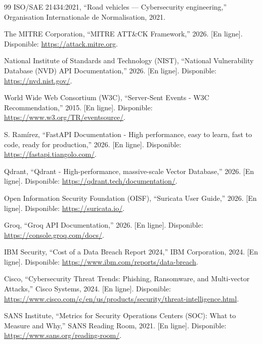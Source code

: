 \documentclass[a4paper, 12pt]{report}
\begin{document}
\begin{thebibliography}{99}
ISO/SAE 21434:2021, ``Road vehicles — Cybersecurity engineering,'' Organisation Internationale de Normalisation, 2021.

The MITRE Corporation, ``MITRE ATT\&CK Framework,'' 2026. [En ligne]. Disponible: \url{https://attack.mitre.org}.

National Institute of Standards and Technology (NIST), ``National Vulnerability Database (NVD) API Documentation,'' 2026. [En ligne]. Disponible: \url{https://nvd.nist.gov/}.

World Wide Web Consortium (W3C), ``Server-Sent Events - W3C Recommendation,'' 2015. [En ligne]. Disponible: \url{https://www.w3.org/TR/eventsource/}.


S. Ramírez, ``FastAPI Documentation - High performance, easy to learn, fast to code, ready for production,'' 2026. [En ligne]. Disponible: \url{https://fastapi.tiangolo.com/}.

Qdrant, ``Qdrant - High-performance, massive-scale Vector Database,'' 2026. [En ligne]. Disponible: \url{https://qdrant.tech/documentation/}.

Open Information Security Foundation (OISF), ``Suricata User Guide,'' 2026. [En ligne]. Disponible: \url{https://suricata.io/}.

Groq, ``Groq API Documentation,'' 2026. [En ligne]. Disponible: \url{https://console.groq.com/docs/}.


IBM Security, ``Cost of a Data Breach Report 2024,'' IBM Corporation, 2024. [En ligne]. Disponible: \url{https://www.ibm.com/reports/data-breach}.

Cisco, ``Cybersecurity Threat Trends: Phishing, Ransomware, and Multi-vector Attacks,'' Cisco Systems, 2024. [En ligne]. Disponible: \url{https://www.cisco.com/c/en/us/products/security/threat-intelligence.html}.

SANS Institute, ``Metrics for Security Operations Centers (SOC): What to Measure and Why,'' SANS Reading Room, 2021. [En ligne]. Disponible: \url{https://www.sans.org/reading-room/}.

\end{thebibliography}
\end{document}
